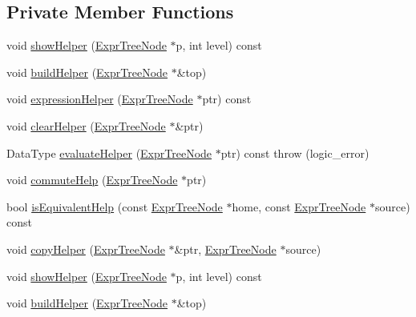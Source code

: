 \subsection*{Private Member Functions}
\begin{DoxyCompactItemize}
\item 
void \hyperlink{class_expr_tree_a7f416a6fdcf60fb637c497c7665024b2}{show\+Helper} (\hyperlink{class_expr_tree_1_1_expr_tree_node}{Expr\+Tree\+Node} $\ast$p, int level) const 
\item 
void \hyperlink{class_expr_tree_ad9146ef34bdb11f158dabbd7bacea930}{build\+Helper} (\hyperlink{class_expr_tree_1_1_expr_tree_node}{Expr\+Tree\+Node} $\ast$\&top)
\item 
void \hyperlink{class_expr_tree_a7575f010e1ca9dfd2abbe15d4fe387b9}{expression\+Helper} (\hyperlink{class_expr_tree_1_1_expr_tree_node}{Expr\+Tree\+Node} $\ast$ptr) const 
\item 
void \hyperlink{class_expr_tree_a3c31a2f832e1949790e79d3f23ffa0bb}{clear\+Helper} (\hyperlink{class_expr_tree_1_1_expr_tree_node}{Expr\+Tree\+Node} $\ast$\&ptr)
\item 
Data\+Type \hyperlink{class_expr_tree_a0e18bcfbe367fcc55eca5a7cc9179788}{evaluate\+Helper} (\hyperlink{class_expr_tree_1_1_expr_tree_node}{Expr\+Tree\+Node} $\ast$ptr) const   throw (logic\+\_\+error)
\item 
void \hyperlink{class_expr_tree_abbf18be89ca86f59350e8d6bab8c65dd}{commute\+Help} (\hyperlink{class_expr_tree_1_1_expr_tree_node}{Expr\+Tree\+Node} $\ast$ptr)
\item 
bool \hyperlink{class_expr_tree_aac6ff43c0f59106d2f137b620aeeda46}{is\+Equivalent\+Help} (const \hyperlink{class_expr_tree_1_1_expr_tree_node}{Expr\+Tree\+Node} $\ast$home, const \hyperlink{class_expr_tree_1_1_expr_tree_node}{Expr\+Tree\+Node} $\ast$source) const 
\item 
void \hyperlink{class_expr_tree_a27c7c1665bf9d5f379ce59925c295a2e}{copy\+Helper} (\hyperlink{class_expr_tree_1_1_expr_tree_node}{Expr\+Tree\+Node} $\ast$\&ptr, \hyperlink{class_expr_tree_1_1_expr_tree_node}{Expr\+Tree\+Node} $\ast$source)
\item 
void \hyperlink{class_expr_tree_a7f416a6fdcf60fb637c497c7665024b2}{show\+Helper} (\hyperlink{class_expr_tree_1_1_expr_tree_node}{Expr\+Tree\+Node} $\ast$p, int level) const 
\item 
void \hyperlink{class_expr_tree_ad9146ef34bdb11f158dabbd7bacea930}{build\+Helper} (\hyperlink{class_expr_tree_1_1_expr_tree_node}{Expr\+Tree\+Node} $\ast$\&top)

\end{DoxyCompactItemize}
